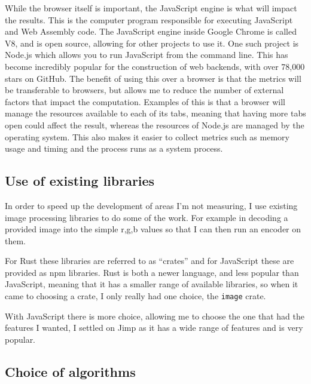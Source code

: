 \documentclass[12pt,a4paper]{article}
\begin{document}
While the browser itself is important, the JavaScript engine is what will impact the results. This is the computer program responsible for executing JavaScript and Web Assembly code. The JavaScript engine inside Google Chrome is called V8, and is open source, allowing for other projects to use it. One such project is Node.js which allows you to run JavaScript from the command line. This has become incredibly popular for the construction of web backends, with over 78,000 stars on GitHub. The benefit of using this over a browser is that the metrics will be transferable to browsers, but allows me to reduce the number of external factors that impact the computation. Examples of this is that a browser will manage the resources available to each of its tabs, meaning that having more tabs open could affect the result, whereas the resources of Node.js are managed by the operating system. This also makes it easier to collect metrics such as memory usage and timing and the process runs as a system process.

\subsection{Use of existing libraries}

In order to speed up the development of areas I'm not measuring, I use existing image processing libraries to do some of the work. For example in decoding a provided image into the simple r,g,b values so that I can then run an encoder on them.

For Rust these libraries are referred to as “crates” and for JavaScript these are provided as npm libraries. Rust is both a newer language, and less popular than JavaScript, meaning that it has a smaller range of available libraries, so when it came to choosing a crate, I only really had one choice, the \texttt{image} crate.

With JavaScript there is more choice, allowing me to choose the one that had the features I wanted, I settled on Jimp as it has a wide range of features and is very popular.



\subsection{Choice of algorithms}
\end{document}
